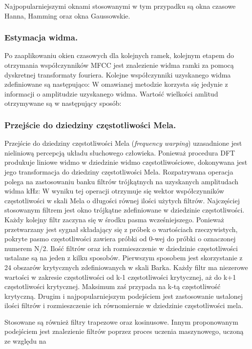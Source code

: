 Najpopularniejszymi oknami stosowanymi w tym przypadku są okna czasowe Hanna, Hamming oraz okna Gaussowskie.

\subsubsection{Estymacja widma.}
Po zaaplikowaniu okien czasowych dla kolejnych ramek, kolejnym etapem do otrzymania współczynników MFCC jest znalezienie widma ramki za pomocą dyskretnej transformaty fouriera. Kolejne współczynniki uzyskanego widma zdefiniowane są następująco:
W omawianej metodzie korzysta się jedynie z informacji o amplitudzie uzyskanego widma. Wartość wielkości amlitud otrzymywane są w następujący sposób:

\subsubsection{Przejście do dziedziny częstotliwości Mela.}
Przejście do dziedziny częstotliwości Mela (\textit{frequency warping}) uzasadnione jest nieliniową percepcją układu słuchowego człowieka. Ponieważ procedura DFT produkuje liniowe widmo w dziedzinie widmo częstotliwościowe, dokonywana jest jego transformacja do dziedziny częstotliwości Mela. 
Rozpatrywana operacja polega na zastosowaniu banku filtrów trójkątnych na uzyskanych amplitudach widma kHz:
W wyniku tej operacji otrzymuje się wektor współczynników częstotliwości w skali Mela o długości równej ilości użytych filtrów. Najczęściej stosowanym filtrem jest okno trójkątne zdefiniowane w dziedzinie częstotliwości. Każdy kolejny filtr zaczyna się w środku pasma wcześniejszego. Ponieważ przetwarzany jest sygnał składający się z próbek o wartościach rzeczywistych, pokryte pasmo częstotliwości zawiera próbki od 0-wej do próbki o oznaczonej numerem N/2. Ilość filtrów oraz ich rozmieszczenie w dziedzinie częstotliwości ustalane są na jeden z kilku sposobów.
Pierwszym sposobem jest skorzystanie z 24 obszarów krytycznych zdefiniowanych w skali Barka. Każdy filtr ma niezerowe wartości w zakresie częstotliwości od k-1 częstotliwości krytycznej, aż do k+1 częstotliwości krytycznej. Maksimum zaś przypada na k-tą częstotliwość krytyczną.
Drugim i najpopularniejszym podejściem jest zastosowanie ustalonej ilości filtrów i rozmieszczenie ich równomiernie w dziedzinie częstotliwości mela.

Stosowane są również filtry trapezowe oraz kosinusowe. Innym proponowanym podejściem jest znalezienie filtrów poprzez proces uczenia maszynowego, uczoną ze względu na %

